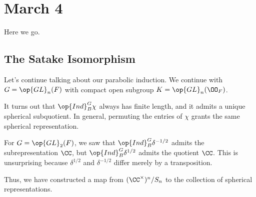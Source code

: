 \documentclass[../notes.tex]{subfiles}
\begin{document}
\section{March 4}
Here we go.

\subsection{The Satake Isomorphism}
Let's continue talking about our parabolic induction. We continue with $G=\op{GL}_n(F)$ with compact open subgroup $K=\op{GL}_n(\OO_F)$.
\begin{remark}
	It turns out that $\op{Ind}_B^G\chi$ always has finite length, and it admits a unique spherical subquotient. In general, permuting the entries of $\chi$ grants the same spherical representation.
\end{remark}
\begin{example}
	For $G=\op{GL}_2(F)$, we saw that $\op{Ind}_B^G\delta^{-1/2}$ admits the subrepresentation $\CC$, but $\op{Ind}_B^G\delta^{1/2}$ admits the quotient $\CC$. This is unsurprising because $\delta^{1/2}$ and $\delta^{-1/2}$ differ merely by a transposition.
\end{example}
Thus, we have constructed a map from $(\CC^\times)^n/S_n$ to the collection of spherical representations.
\end{document}
